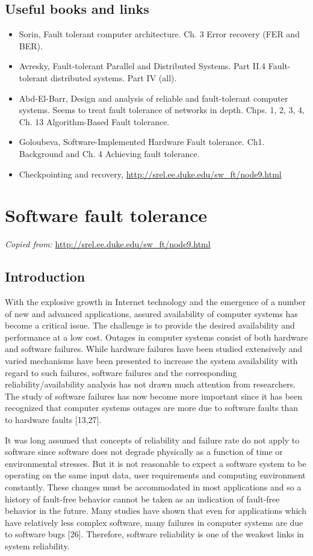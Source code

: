 \documentclass[a4paper, 11pt]{article}
\begin{document}
\subsection{Useful books and links}
\begin{itemize}
\item Sorin, Fault tolerant computer architecture. Ch. 3 Error recovery (FER and BER).
\item Avresky, Fault-tolerant Parallel and Distributed Systems. Part II.4 Fault-tolerant distributed systems. Part IV (all).
\item Abd-El-Barr, Design and analysis of reliable and fault-tolerant computer systems. Seems to treat fault tolerance of networks in depth. Chps. 1, 2, 3, 4, Ch. 13 Algorithm-Based Fault tolerance.
\item Goloubeva, Software-Implemented Hardware Fault tolerance. Ch1. Background and Ch. 4 Achieving fault tolerance.
\item Checkpointing and recovery, \url{http://srel.ee.duke.edu/sw_ft/node9.html}
\end{itemize}

\newpage
\section{Software fault tolerance}
\textit{Copied from:} \url{http://srel.ee.duke.edu/sw_ft/node9.html}
\subsection{Introduction}
With the explosive growth in Internet technology and the emergence of a number of new and advanced applications, assured availability of computer systems has become a critical issue. The challenge is to provide the desired availability and performance at a low cost.
Outages in computer systems consist of both hardware and software failures. While hardware failures have been studied extensively and varied mechanisms have been presented to increase the system availability with regard to such failures, software failures and the corresponding reliability/availability analysis has not drawn much attention from researchers. The study of software failures has now become more important since it has been recognized that computer systems outages are more due to software faults than to hardware faults [13,27].

It was long assumed that concepts of reliability and failure rate do not apply to software since software does not degrade physically as a function of time or environmental stresses. But it is not reasonable to expect a software system to be operating on the same input data, user requirements and computing environment constantly. These changes must be accommodated in most applications and so a history of fault-free behavior cannot be taken as an indication of fault-free behavior in the future. Many studies have shown that even for applications which have relatively less complex software, many failures in computer systems are due to software bugs [26]. Therefore, software reliability is one of the weakest links in system reliability.
\end{document}
